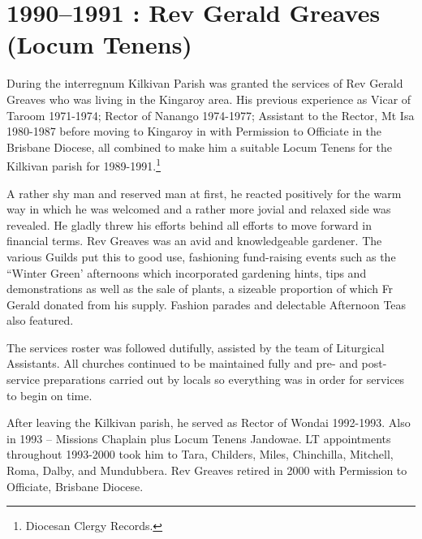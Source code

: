 \section{1990--1991 : Rev Gerald Greaves (Locum Tenens)}



During the interregnum Kilkivan Parish was granted the services of Rev Gerald Greaves who was living in the Kingaroy area. His previous experience as Vicar of Taroom 1971-1974; Rector of Nanango 1974-1977; Assistant to the Rector, Mt Isa 1980-1987 before moving to Kingaroy in with Permission to Officiate in the Brisbane Diocese, all combined to make him a suitable Locum Tenens for the Kilkivan parish for 1989-1991.\footnote{Diocesan Clergy Records.}


A rather shy man and reserved man at first, he reacted positively for the warm way in which he was welcomed and a rather more jovial and relaxed side was revealed. He gladly threw his efforts behind all efforts to move forward in financial terms. Rev Greaves was an avid and knowledgeable gardener. The various Guilds put this to good use, fashioning fund-raising events such as the ``Winter Green' afternoons which incorporated gardening hints, tips and demonstrations as well as the sale of plants, a sizeable proportion of which Fr Gerald donated from his supply. Fashion parades and delectable Afternoon Teas also featured.



The services roster was followed dutifully, assisted by the team of Liturgical Assistants. All churches continued to be maintained fully and pre- and post-service preparations carried out by locals so everything was in order for services to begin on time.



After leaving the Kilkivan parish, he served as Rector of Wondai 1992-1993. Also in 1993 -- Missions Chaplain plus Locum Tenens Jandowae. LT appointments throughout 1993-2000 took him to Tara, Childers, Miles, Chinchilla, Mitchell, Roma, Dalby, and Mundubbera. Rev Greaves retired in 2000 with Permission to Officiate, Brisbane Diocese.



\balance


